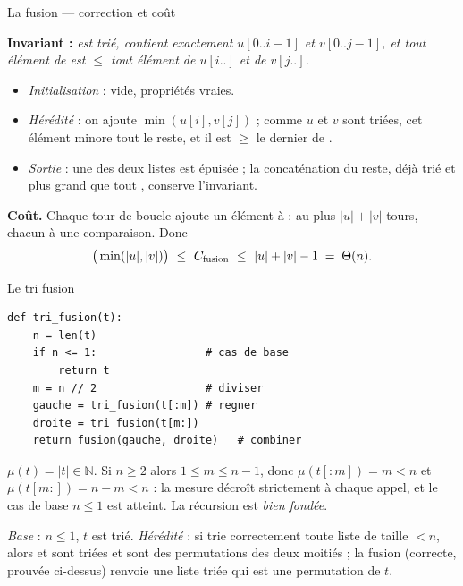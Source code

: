 \documentclass[11pt,aspectratio=169]{beamer}
\begin{document}
\begin{frame}{La fusion --- correction et coût}
\begin{correction}
\small
\textbf{Invariant :} \emph{ est trié,  contient exactement
$u[0..i-1]$ et $v[0..j-1]$, et tout élément de  est $\le$ tout élément de
$u[i..]$ et de $v[j..]$.}
\begin{itemize}\setlength\itemsep{1pt}
  \item \emph{Initialisation} :  vide, propriétés vraies.
  \item \emph{Hérédité} : on ajoute $\min(u[i],v[j])$ ; comme $u$ et $v$ sont triées, cet
        élément minore tout le reste, et il est $\ge$ le dernier de .
  \item \emph{Sortie} : une des deux listes est épuisée ; la concaténation du reste, déjà
        trié et plus grand que tout , conserve l'invariant.
\end{itemize}
\end{correction}
\vspace{3pt}
\begin{encadre}\small
\textbf{Coût.} Chaque tour de boucle ajoute un élément à  : au plus $|u|+|v|$
tours, chacun à une comparaison. Donc
\[
\big(\min(|u|,|v|)\big)\ \le\ C_{\text{fusion}}\ \le\ |u|+|v|-1 \;=\; \Th(n).
\]
\end{encadre}
\end{frame}

\begin{frame}[fragile,shrink=15]{Le tri fusion}
\begin{lstlisting}
def tri_fusion(t):
    n = len(t)
    if n <= 1:                 # cas de base
        return t
    m = n // 2                 # diviser
    gauche = tri_fusion(t[:m]) # regner
    droite = tri_fusion(t[m:])
    return fusion(gauche, droite)   # combiner
\end{lstlisting}
\begin{terminaisonrec}
$\mu(t)=|t|\in\mathbb N$. Si $n\ge2$ alors $1\le m\le n-1$, donc
$\mu(t[:m])=m<n$ et $\mu(t[m:])=n-m<n$ : la mesure décroît strictement à chaque appel,
et le cas de base $n\le1$ est atteint. La récursion est \emph{bien fondée}.
\end{terminaisonrec}
\vspace{2pt}
\begin{correction}
\small
\emph{Base} : $n\le1$, $t$ est trié. \emph{Hérédité} : si  trie
correctement toute liste de taille $<n$, alors  et  sont triées et
sont des permutations des deux moitiés ; la fusion (correcte, prouvée ci-dessus) renvoie
une liste triée qui est une permutation de $t$.
\end{correction}
\end{frame}
\end{document}
